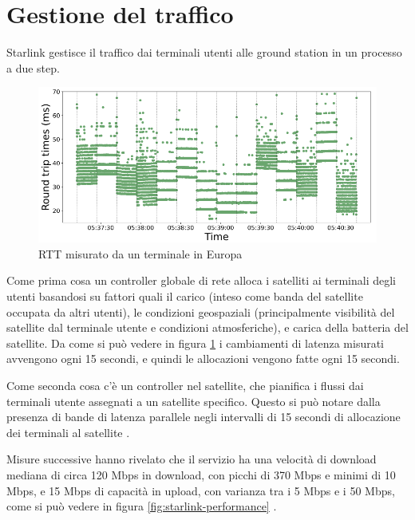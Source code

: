 \section{Gestione del traffico}
Starlink gestisce il traffico dai terminali utenti alle ground station in un processo a due step.

\begin{figure}[htbp]
  \centering
  \includegraphics[width=0.8\linewidth]{./res/img/rtt_euterminal.png}
  \caption{\ac{RTT} misurato da un terminale in Europa \cite{tanveer_making_2023}}
  \label{fig:rtt-euterminal}
\end{figure}

Come prima cosa un controller globale di rete alloca i satelliti ai terminali degli utenti basandosi su fattori quali il carico (inteso come banda del satellite occupata da altri utenti), le condizioni geospaziali (principalmente visibilità del satellite dal terminale utente e condizioni atmosferiche), e carica della batteria del satellite.
Da come si può vedere in figura \ref{fig:rtt-euterminal} i cambiamenti di latenza misurati avvengono ogni 15 secondi, e quindi le allocazioni vengono fatte ogni 15 secondi.

Come seconda cosa c'è un controller nel satellite, che pianifica i flussi dai terminali utente assegnati a un satellite specifico.
Questo si può notare dalla presenza di bande di latenza parallele negli intervalli di 15 secondi di allocazione dei terminali al satellite \cite{tanveer_making_2023} \cite{geoff_huston_transport_2024}.

Misure successive hanno rivelato che il servizio ha una velocità di download mediana di circa 120 Mbps in download, con picchi di 370 Mbps e minimi di 10 Mbps, e 15 Mbps di capacità in upload, con varianza tra i 5 Mbps e i 50 Mbps, come si può vedere in figura \ref{fig:starlink-performance} \cite{geoff_huston_transport_2024}.

